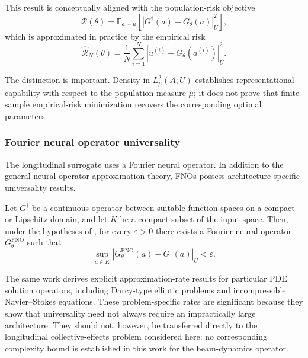 \documentclass[11pt,a4paper]{article}
\begin{document}
\begin{sloppypar}
This result is conceptually aligned with the population-risk objective
\begin{equation}
\mathcal{R}(\theta)
=
\mathbb{E}_{a\sim\mu}
\left[
\left|
G^\dagger(a)
-
G_\theta(a)
\right|_U^2
\right],
\label{eq:population-operator-risk}
\end{equation}
which is approximated in practice by the empirical risk
\begin{equation}
\widehat{\mathcal{R}}_N(\theta)
=
\frac{1}{N}
\sum_{i=1}^{N}
\left|
u^{(i)}
-
G_\theta
\left(
a^{(i)}
\right)
\right|_U^2.
\label{eq:empirical-operator-risk}
\end{equation}

The distinction is important. Density in $L^2_\mu(A;U)$ establishes representational capability with respect to the population measure $\mu$; it does not prove that finite-sample empirical-risk minimization recovers the corresponding optimal parameters.

\subsubsection{Fourier neural operator universality}

The longitudinal surrogate uses a Fourier neural operator. In addition to the general neural-operator approximation theory, FNOs possess architecture-specific universality results.

\begin{theorem}
Let $G^\dagger$ be a continuous operator between suitable function spaces on a compact or Lipschitz domain, and let $K$ be a compact subset of the input space. Then, under the hypotheses of \cite{kovachki_neural_2023}, for every $\varepsilon>0$ there exists a Fourier neural operator $G_\theta^{\mathrm{FNO}}$ such that
\begin{equation}
\sup_{a\in K}
\left|
G_\theta^{\mathrm{FNO}}(a)
-
G^\dagger(a)
\right|_U
<
\varepsilon.
\label{eq:fno-universal-approximation}
\end{equation}
\end{theorem}

The same work derives explicit approximation-rate results for particular PDE solution operators, including Darcy-type elliptic problems and incompressible Navier--Stokes equations. These problem-specific rates are significant because they show that universality need not always require an impractically large architecture. They should not, however, be transferred directly to the longitudinal collective-effects problem considered here: no corresponding complexity bound is established in this work for the beam-dynamics operator.


\end{sloppypar}
\end{document}
